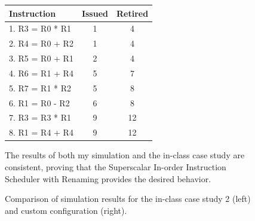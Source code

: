 \documentclass{article}
\begin{document}
\begin{enumerate}
\begin{figure}[H]
\begin{minipage}[t]{0.45\textwidth}
        \end{minipage}
        \begin{minipage}[t]{0.45\textwidth}
            \centering
            \renewcommand{\arraystretch}{1.2} %
            \setlength{\tabcolsep}{3pt} %
            \begin{tabular}{|p{3.4cm}|c|c|}
                \hline
                \textbf{Instruction} & \textbf{Issued} & \textbf{Retired} \\ \hline
                1. R3 = R0 * R1 & 1 & 4 \\ \hline 
                2. R4 = R0 + R2 & 1 & 4 \\ \hline 
                3. R5 = R0 + R1 & 2 & 4 \\ \hline 
                4. R6 = R1 + R4 & 5 & 7 \\ \hline 
                5. R7 = R1 * R2 & 5 & 8 \\ \hline
                6. R1 = R0 - R2 & 6 & 8 \\ \hline
                7. R3 = R3 * R1 & 9 & 12 \\ \hline 
                8. R1 = R4 + R4 & 9 & 12 \\ \hline 
            \end{tabular}
            \vspace{1em} %
            \raggedright

            The results of both my simulation and the in-class case study are consistent, proving that the Superscalar In-order Instruction Scheduler with Renaming provides the desired behavior.
        \end{minipage}
        \caption{Comparison of simulation results for the in-class case study 2 (left) and custom configuration (right).}
    \end{figure}


\end{enumerate}
\end{document}
